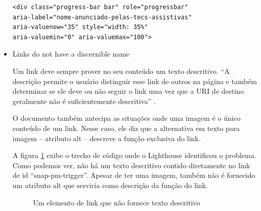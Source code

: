 \documentclass[
	12pt,				%
	openright,			%
	oneside,			%
	a4paper,			%
	chapter=TITLE,		%
	section=TITLE,		%
	subsection=TITLE,	%
	subsubsection=TITLE,%
	english,			%
	brazil				%
	]{abntex2}
\theoremstyle{definition}
\begin{document}
\begin{itemize}
\begin{center}
\begin{minipage}{10cm}
\begin{verbatim}
<div class="progress-bar bar" role="progressbar" 
aria-label="nome-anunciado-pelas-tecs-assistivas" 
aria-valuenow="35" style="width: 35%" 
aria-valuemin="0" aria-valuemax="100">
\end{verbatim}
\end{minipage}
\end{center}

 \item Links do not have a discernible name
   
Um link deve sempre prover no seu conteúdo um texto descritivo. “A descrição permite o usuário distinguir esse link de outros na página e também determinar se ele deve ou não seguir o link uma vez que a URI de destino geralmente não é suficientemente descritiva” \cite{cooper2010techniques}.

O documento também antecipa as situações onde uma imagem é o único conteúdo de um link. Nesse caso, ele diz que a alternativa em texto para imagem – atributo alt – descreve a função exclusiva do link.

A figura \ref{Um elemento de link que não fornece texto descritivo} exibe o trecho de código onde o Lighthouse identificou o problema. Como podemos ver, não há um texto descritivo contido diretamente no link de id “snap-pm-trigger”. Apesar de ter uma imagem, também não é fornecido um  atributo alt que serviria como descrição da função do link.

\begin{figure}[!h]
\centering
\caption{Um elemento de link que não fornece texto descritivo}
\label{Um elemento de link que não fornece texto descritivo}
\end{figure}


\end{itemize}
\end{document}
